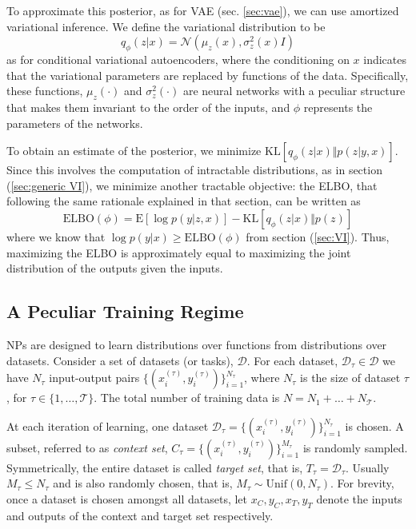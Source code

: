 To approximate this posterior, as for VAE (sec. \cref{sec:vae}), we can use amortized variational inference. We define the variational distribution to be 
\begin{equation*}
    q_\phi(z|x) = \mathcal{N}\left(\mu_z(x), \sigma^2_z(x)I\right)
\end{equation*}
as for conditional variational autoencoders, where the conditioning on $x$ indicates that the variational parameters are replaced by functions of the data. Specifically, these functions, $\mu_z(\cdot)$ and $\sigma^2_z(\cdot)$ are neural networks with a peculiar structure that makes them invariant to the order of the inputs, and $\phi$ represents the parameters of the networks. 

To obtain an estimate of the posterior, we minimize $\mathrm{KL}[q_\phi(z|x)\Vert p(z|y,x)]$. Since this involves the computation of intractable distributions, as in section (\cref{sec:generic VI}), we minimize another tractable objective: the ELBO, that following the same rationale explained in that section, can be written as
\begin{equation}\label{eq:NPelbo}
    \mathrm{ELBO}(\phi) = \mathrm{E}[\log p(y|z,x)] - \mathrm{KL}[q_\phi(z|x)\Vert p(z)]
\end{equation}
where we know that $\log p(y|x) \geq \mathrm{ELBO}(\phi)$ from section (\cref{sec:VI}). Thus, maximizing the ELBO is approximately equal to maximizing the joint distribution of the outputs given the inputs.



\subsection{A Peculiar Training Regime}
NPs are designed to learn distributions over functions from distributions over datasets. Consider a set of datasets (or tasks), $\mathcal{D}$. For each dataset, $\mathcal{D}_\tau \in \mathcal{D}$ we have $N_\tau$ input-output pairs $\{(x_i^{(\tau)}, y_i^{(\tau)})\}_{i=1}^{N_\tau}$, where $N_\tau$ is the size of dataset $\tau$, for $\tau\in\{1,\dots,\mathcal{T}\}$. The total number of training data is $N = N_1 + \dots + N_\mathcal{T}$.

At each iteration of learning, one dataset $\mathcal{D}_\tau = \{(x_i^{(\tau)},y_i^{(\tau)})\}_{i=1}^{N_\tau}$ is chosen. A subset, referred to as \textit{context set}, $C_\tau = \{(x_i^{(\tau)},y_i^{(\tau)})\}_{i=1}^{M_\tau}$ is randomly sampled. Symmetrically, the entire dataset is called \textit{target set}, that is, $T_\tau = \mathcal{D}_\tau$. Usually $M_\tau\leq N_\tau$ and is also randomly chosen, that is, $M_\tau \sim \mathrm{Unif}(0, N_\tau)$. For brevity, once a dataset is chosen amongst all datasets, let $x_C, y_C, x_T, y_T$ denote the inputs and outputs of the context and target set respectively.

